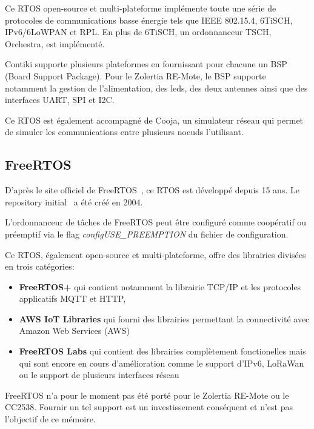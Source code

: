     Ce RTOS open-source et multi-plateforme implémente toute une série de protocoles de communications basse énergie tels que IEEE 802.15.4, 6TiSCH, IPv6/6LoWPAN et RPL. En plus de 6TiSCH, un ordonnanceur TSCH, Orchestra, est implémenté.
    

    Contiki supporte plusieurs plateformes en fournissant pour chacune un BSP (Board Support Package). Pour le Zolertia RE-Mote, le BSP supporte notamment la gestion de l'alimentation, des leds, des deux antennes ainsi que des interfaces UART, SPI et I2C.

    Ce RTOS est également accompagné de Cooja, un simulateur réseau qui permet de simuler les communications entre plusieurs noeuds l'utilisant.

\subsection*{FreeRTOS}
    D'après le site officiel de FreeRTOS~\cite{freertos}, ce RTOS est développé depuis 15 ans.
    Le repository initial~\cite{freertos:repo} a été créé en 2004.

    L'ordonnanceur de tâches de FreeRTOS peut être configuré comme coopératif ou préemptif via le flag \textit{configUSE\_PREEMPTION} du fichier de configuration.

    Ce RTOS, également open-source et multi-plateforme, offre des librairies divisées en trois catégories:
    \begin{itemize}

        \item \textbf{FreeRTOS+} qui contient notamment la librairie TCP/IP et les protocoles applicatifs MQTT et HTTP,
        \item \textbf{AWS IoT Libraries} qui fourni des librairies permettant la connectivité avec Amazon Web Services (AWS)
        \item \textbf{FreeRTOS Labs} qui contient des librairies complètement fonctionelles mais qui sont encore en cours d'amélioration comme le support d'IPv6, LoRaWan ou le support de plusieurs interfaces réseau
    \end{itemize}
    \vspace{0.5cm}
    FreeRTOS n'a pour le moment pas été porté pour le Zolertia RE-Mote ou le CC2538. Fournir un tel support est un investissement conséquent et n'est pas l'objectif de ce mémoire.

